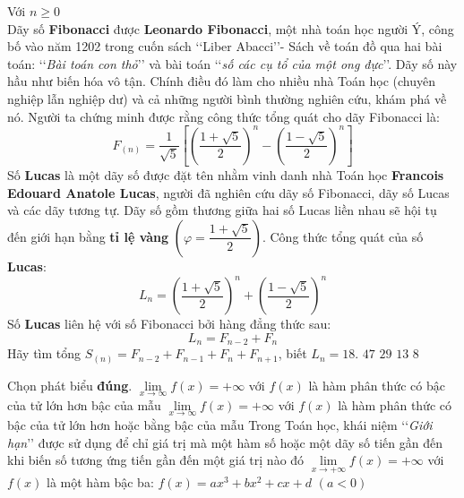 \begin{ex}%
	Với $n\geq0$\\
	Dãy số \textbf{Fibonacci} được \textbf{Leonardo Fibonacci}, một nhà toán học người Ý, công bố vào năm 1202 trong cuốn sách \lq\lq Liber Abacci\rq\rq - Sách về toán đồ qua hai bài toán: \lq\lq \textit{Bài toán con thỏ}\rq\rq{} và bài toán \lq\lq \textit{số các cụ tổ của một ong đực}\rq\rq. Dãy số này hầu như biến hóa vô tận. Chính điều đó làm cho nhiều nhà Toán học (chuyên nghiệp lẫn nghiệp dư) và cả những người bình thường nghiên cứu, khám phá về nó. Người ta chứng minh được rằng công thức tổng quát cho dãy Fibonacci là:
	\[F_{(n)}=\dfrac{1}{\sqrt{5}}\left[\left(\dfrac{1+\sqrt{5}}{2}\right)^n -\left(\dfrac{1-\sqrt{5}}{2}\right)^n \right]\]
	Số \textbf{Lucas} là một dãy số được đặt tên nhằm vinh danh nhà Toán học \textbf{Francois Edouard Anatole Lucas}, người đã nghiên cứu dãy số Fibonacci, dãy số Lucas và các dãy tương tự. Dãy số gồm thương giữa hai số Lucas liền nhau sẽ hội tụ đến giới hạn bằng \textbf{tỉ lệ vàng} $\left(\varphi=\dfrac{1+\sqrt{5}}{2} \right)$. Công thức tổng quát của số \textbf{Lucas}:
	\[L_n=\left(\dfrac{1+\sqrt{5}}{2}\right)^n+\left(\dfrac{1-\sqrt{5}}{2}\right)^n\]
	Số \textbf{Lucas} liên hệ với số Fibonacci bởi hàng đẳng thức sau:
	\[L_n=F_{n-2}+F_n\]
	Hãy tìm tổng $S_{(n)}=F_{n-2}+F_{n-1}+F_{n}+F_{n+1}$, biết $L_{n}=18$.
	\choice
	{\True $47$}
	{$29$}
	{$13$}
	{$8$}
	
\end{ex}

\begin{ex}%
	Chọn phát biểu \textbf{đúng}.
	\choice
	{$\lim\limits_{x\to\infty}f(x)=+\infty$ với $f(x)$ là hàm phân thức có bậc của tử lớn hơn bậc của mẫu}
	{$\lim\limits_{x\to \infty}f(x)=+\infty$ với $f(x)$ là hàm phân thức có bậc của tử lớn hơn hoặc bằng bậc của mẫu}
	{\True Trong Toán học, khái niệm \lq\lq \textit{Giới hạn}\rq\rq{} được sử dụng để chỉ giá trị mà một hàm số hoặc một dãy số tiến gần đến khi biến số tương ứng tiến gần đến một giá trị nào đó}
	{$\lim\limits_{x\to+\infty}f(x)=+\infty$ với $f(x)$ là một hàm bậc ba: $f(x)=ax^3+bx^2+cx+d$ $(a<0)$}
\end{ex}

